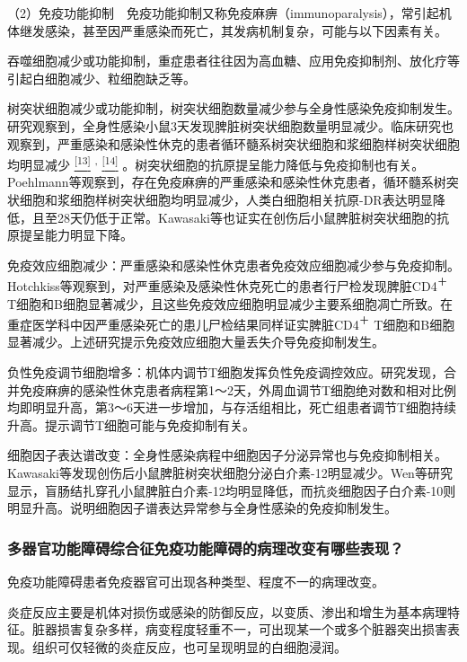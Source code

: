 （2）免疫功能抑制　免疫功能抑制又称免疫麻痹（immunoparalysis），常引起机体继发感染，甚至因严重感染而死亡，其发病机制复杂，可能与以下因素有关。

吞噬细胞减少或功能抑制，重症患者往往因为高血糖、应用免疫抑制剂、放化疗等引起白细胞减少、粒细胞缺乏等。

树突状细胞减少或功能抑制，树突状细胞数量减少参与全身性感染免疫抑制发生。研究观察到，全身性感染小鼠3天发现脾脏树突状细胞数量明显减少。临床研究也观察到，严重感染和感染性休克的患者循环髓系树突状细胞和浆细胞样树突状细胞均明显减少
\protect\hyperlink{text00007.htmlux5cux23ch13-6}{\textsuperscript{{[}13{]}}}
\textsuperscript{,}
\protect\hyperlink{text00007.htmlux5cux23ch14-6}{\textsuperscript{{[}14{]}}}
。树突状细胞的抗原提呈能力降低与免疫抑制也有关。Poehlmann等观察到，存在免疫麻痹的严重感染和感染性休克患者，循环髓系树突状细胞和浆细胞样树突状细胞均明显减少，人类白细胞相关抗原-DR表达明显降低，且至28天仍低于正常。Kawasaki等也证实在创伤后小鼠脾脏树突状细胞的抗原提呈能力明显下降。

免疫效应细胞减少：严重感染和感染性休克患者免疫效应细胞减少参与免疫抑制。Hotchkiss等观察到，对严重感染及感染性休克死亡的患者行尸检发现脾脏CD4\textsuperscript{＋}
T细胞和B细胞显著减少，且这些免疫效应细胞明显减少主要系细胞凋亡所致。在重症医学科中因严重感染死亡的患儿尸检结果同样证实脾脏CD4\textsuperscript{＋}
T细胞和B细胞显著减少。上述研究提示免疫效应细胞大量丢失介导免疫抑制发生。

负性免疫调节细胞增多：机体内调节T细胞发挥负性免疫调控效应。研究发现，合并免疫麻痹的感染性休克患者病程第1～2天，外周血调节T细胞绝对数和相对比例均即明显升高，第3～6天进一步增加，与存活组相比，死亡组患者调节T细胞持续升高。提示调节T细胞可能与免疫抑制有关。

细胞因子表达谱改变：全身性感染病程中细胞因子分泌异常也与免疫抑制相关。Kawasaki等发现创伤后小鼠脾脏树突状细胞分泌白介素-12明显减少。Wen等研究显示，盲肠结扎穿孔小鼠脾脏白介素-12均明显降低，而抗炎细胞因子白介素-10则明显升高。说明细胞因子谱表达异常参与全身性感染的免疫抑制发生。

\subsubsection{多器官功能障碍综合征免疫功能障碍的病理改变有哪些表现？}

免疫功能障碍患者免疫器官可出现各种类型、程度不一的病理改变。

炎症反应主要是机体对损伤或感染的防御反应，以变质、渗出和增生为基本病理特征。脏器损害复杂多样，病变程度轻重不一，可出现某一个或多个脏器突出损害表现。组织可仅轻微的炎症反应，也可呈现明显的白细胞浸润。


